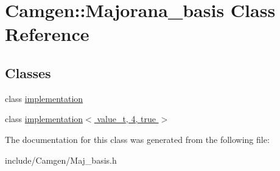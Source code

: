 \hypertarget{a00336}{\section{Camgen\-:\-:Majorana\-\_\-basis Class Reference}
\label{a00336}
}
\subsection*{Classes}
\begin{DoxyCompactItemize}
\item 
class \hyperlink{a00291}{implementation}
\item 
class \hyperlink{a00302}{implementation$<$ value\-\_\-t, 4, true $>$}
\end{DoxyCompactItemize}


The documentation for this class was generated from the following file\-:\begin{DoxyCompactItemize}
\item 
include/\-Camgen/Maj\-\_\-basis.\-h\end{DoxyCompactItemize}
